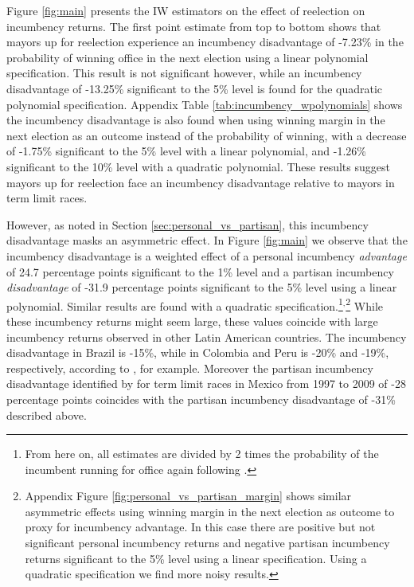\documentclass[12pt]{amsart}
\makeatletter
\def\section{\@startsection{section}{1}
	\z@{1.0\linespacing\@plus\linespacing}{.5\linespacing}{\Large}}
\numberwithin{equation}{section}
\theoremstyle{definition}
\theoremstyle{definition}
\theoremstyle{definition}
\makeatother
\begin{document}

\section{Main Results \label{sec:results}}

Figure \ref{fig:main} presents the IW estimators on the effect of reelection on incumbency returns. The first point estimate from top to bottom shows that mayors up for reelection experience an incumbency disadvantage of -7.23\% in the probability of winning office in the next election using a linear polynomial specification. This result is not significant however, while an incumbency disadvantage of -13.25\% significant to the 5\% level is found for the quadratic polynomial specification. Appendix Table \ref{tab:incumbency_wpolynomials} shows the incumbency disadvantage is also found when using winning margin in the next election as an outcome instead of the probability of winning, with a decrease of -1.75\% significant to the 5\% level with a linear polynomial, and -1.26\% significant to the 10\% level with a quadratic polynomial. These results suggest mayors up for reelection face an incumbency disadvantage relative to mayors in term limit races.   

However, as noted in Section \ref{sec:personal_vs_partisan}, this incumbency disadvantage masks an asymmetric effect. In Figure \ref{fig:main} we observe that the incumbency disadvantage is a weighted effect of a personal incumbency \emph{advantage} of 24.7 percentage points significant to the 1\% level and a partisan incumbency \emph{disadvantage} of -31.9 percentage points significant to the 5\% level using a linear polynomial. Similar results are found with a quadratic specification.\footnote{From here on, all estimates are divided by 2 times the probability of the incumbent running for office again following \citet{erikson_titiunik_2015}.}$^,$\footnote{Appendix Figure \ref{fig:personal_vs_partisan_margin} shows similar asymmetric effects using winning margin in the next election as outcome to proxy for incumbency advantage. In this case there are positive but not significant personal incumbency returns and negative partisan incumbency returns significant to the 5\% level using a linear specification. Using a quadratic specification we find more noisy results.} While these incumbency returns might seem large, these values coincide with large incumbency returns observed in other Latin American countries. The incumbency disadvantage in Brazil is -15\%, while in Colombia and Peru is -20\% and -19\%, respectively, according to \citet{klasnja_titiunik_2017}, for example. Moreover the partisan incumbency disadvantage identified by \citet{klasnja_titiunik_2017} for term limit races in Mexico from 1997 to 2009 of -28 percentage points coincides with the partisan incumbency disadvantage of -31\% described above. 
   
\end{document}
